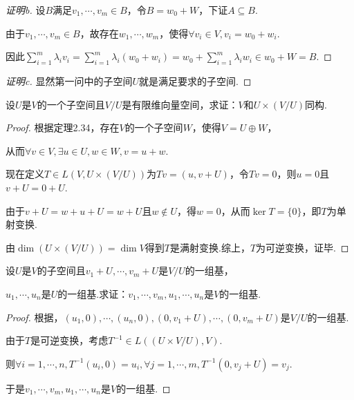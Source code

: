 \begin{proof}[证明b]
    设\(B\)满足\(v_1,\cdots,v_m \in B\)，令\(B=w_0+W\)，下证\(A \subseteq B\).

    由于\(v_1,\cdots,v_m \in B\)，故存在\(w_1,\cdots,w_m\)，使得\(\forall v_i \in V,v_i=w_0+w_i\).

    因此\(\sum_{i=1}^m \lambda_i v_i=\sum_{i=1}^m \lambda_i(w_0+w_i)=w_0+\sum_{i=1}^m \lambda_i w_i \in w_0+W=B\).
\end{proof}

\begin{proof}[证明c]
    显然第一问中的子空间\(U\)就是满足要求的子空间.
\end{proof}

\begin{problem}[12]\label{3.E.12}
    设\(U\)是\(V\)的一个子空间且\(V/U\)是有限维向量空间，求证：\(V\)和\(U \times (V/U)\)同构.
\end{problem}

\begin{proof}
    根据定理2.34，存在\(V\)的一个子空间\(W\)，使得\(V=U \oplus W\)，

    从而\(\forall v \in V, \exists u \in U,w \in W,v=u+w\).
    
    现在定义\(T \in L(V,U \times (V/U))\)为\(Tv=(u,v+U)\)，令\(Tv=0\)，则\(u=0\)且\(v+U=0+U\).
    
    由于\(v+U=w+u+U=w+U\)且\(w \notin U\)，得\(w=0\)，从而\(\ker T=\{0\}\)，即\(T\)为单射变换.
    
    由\(\dim (U \times (V/U))=\dim V\)得到\(T\)是满射变换.综上，\(T\)为可逆变换，证毕.
\end{proof}

\begin{problem}[13]\label{3.E.13}
    设\(U\)是\(V\)的子空间且\(v_1+U,\cdots,v_m+U\)是\(V/U\)的一组基，
    
    \(u_1,\cdots,u_n\)是\(U\)的一组基.求证：\(v_1,\cdots,v_m,u_1,\cdots,u_n\)是\(V\)的一组基.
\end{problem}

\begin{proof}
    根据，\((u_1,0),\cdots,(u_n,0),(0,v_1+U),\cdots,(0,v_m+U)\)是\(V/U\)的一组基.

    由于\(T\)是可逆变换，考虑\(T^{-1} \in L((U \times V/U),V)\).

    则\(\forall i=1,\cdots,n,T^{-1}(u_i,0)=u_i,\forall j=1,\cdots,m,T^{-1}(0,v_j+U)=v_j\).

    于是\(v_1,\cdots,v_m,u_1,\cdots,u_n\)是\(V\)的一组基.
\end{proof}

